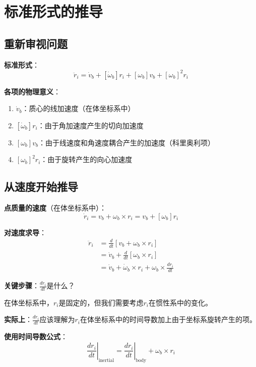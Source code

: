 \documentclass[12pt,a4paper]{article}
\begin{document}
\section{标准形式的推导}

\subsection{重新审视问题}

\textbf{标准形式}：
\begin{equation}
\ddot{r}_i = \dot{v}_b + [\dot{\omega}_b] r_i + [\omega_b] v_b + [\omega_b]^2 r_i
\end{equation}

\textbf{各项的物理意义}：
\begin{enumerate}
\item $\dot{v}_b$：质心的线加速度（在体坐标系中）
\item $[\dot{\omega}_b] r_i$：由于角加速度产生的切向加速度
\item $[\omega_b] v_b$：由于线速度和角速度耦合产生的加速度（科里奥利项）
\item $[\omega_b]^2 r_i$：由于旋转产生的向心加速度
\end{enumerate}

\subsection{从速度开始推导}

\textbf{点质量的速度}（在体坐标系中）：
\begin{equation}
\dot{r}_i = v_b + \omega_b \times r_i = v_b + [\omega_b] r_i
\end{equation}

\textbf{对速度求导}：
\begin{align}
\ddot{r}_i &= \frac{d}{dt}[v_b + \omega_b \times r_i] \\
&= \dot{v}_b + \frac{d}{dt}[\omega_b \times r_i] \\
&= \dot{v}_b + \dot{\omega}_b \times r_i + \omega_b \times \frac{dr_i}{dt}
\end{align}

\textbf{关键步骤}：$\frac{dr_i}{dt}$是什么？

在体坐标系中，$r_i$是固定的，但我们需要考虑$r_i$在惯性系中的变化。

\textbf{实际上}：$\frac{dr_i}{dt}$应该理解为$r_i$在体坐标系中的时间导数加上由于坐标系旋转产生的项。

\textbf{使用时间导数公式}：
\begin{equation}
\left.\frac{dr_i}{dt}\right|_{\text{inertial}} = \left.\frac{dr_i}{dt}\right|_{\text{body}} + \omega_b \times r_i
\end{equation}
\end{document}
